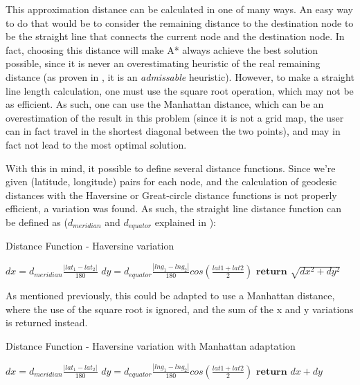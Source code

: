 \documentclass[a4paper, 12pt]{report}
\begin{document}
    This approximation distance can be calculated in one of many ways. An easy way to do that would be to consider the remaining distance to the destination node to be the straight line that connects the current node and the destination node. In fact, choosing this distance will make A* always achieve the best solution possible, since it is never an overestimating heuristic of the real remaining distance (as proven in \cite{heuristics}\cite{adaixo}, it is an \textit{admissable} heuristic). However, to make a straight line length calculation, one must use the square root operation, which may not be as efficient. As such, one can use the Manhattan distance, which can be an overestimation of the result in this problem (since it is not a grid map, the user can in fact travel in the shortest diagonal between the two points), and may in fact not lead to the most optimal solution.
    
    With this in mind, it possible to define several distance functions. Since we're given (latitude, longitude) pairs for each node, and the calculation of geodesic distances with the Haversine or Great-circle distance functions is not properly efficient, a variation was found. As such, the straight line distance function can be defined as ($d_{meridian}$ and $d_{equator}$ explained in \cite{distance}):
    
    
    \begin{algorithm}[H]
        \label{alg:dist1}
    	\caption{Distance Function - Haversine variation} 
	    \begin{algorithmic}[1]
		\State $dx = d_{meridian} \frac{|lat_1 - lat_2|}{180}$
		\State $dy = d_{equator} \frac{|lng_1 - lng_2|}{180} cos(\frac{lat1 + lat2}{2})$
        \State $\textbf{return}$ $\sqrt{dx^2 + dy^2}$
	    \end{algorithmic} 
	\end{algorithm}
    As mentioned previously, this could be adapted to use a Manhattan distance, where the use of the square root is ignored, and the sum of the x and y variations is returned instead.
    
    \begin{algorithm}
        \label{alg:dist2}
    	\caption{Distance Function - Haversine variation with Manhattan adaptation} 
	    \begin{algorithmic}[1]
		\State $dx = d_{meridian} \frac{|lat_1 - lat_2|}{180}$
		\State $dy = d_{equator} \frac{|lng_1 - lng_2|}{180} cos(\frac{lat1 + lat2}{2})$
        \State $\textbf{return}$ $dx + dy$
	    \end{algorithmic} 
	\end{algorithm}
    
\end{document}
